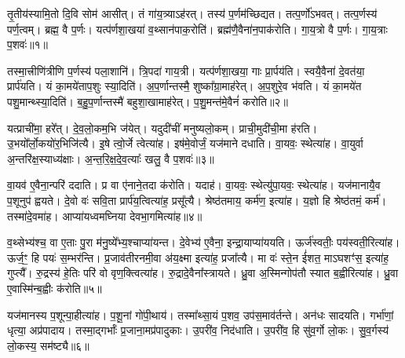\clearpage
{}
\setcounter{anuvakam}{0}

तृ॒तीय॑स्यामि॒तो दि॒वि सोम॑ आसीत्।
तं गा॑य॒त्र्या\-ऽह॑रत्।
तस्य॑ प॒र्णम॑च्छिद्यत।
तत्प॒र्णो॑\-ऽभवत्।
तत्प॒र्णस्य॑ पर्ण॒त्वम्।
ब्रह्म॒ वै प॒र्णः।
यत्प॑र्णशा॒खया॑ व॒थ्सान॑पाक॒रोति॑।
ब्रह्म॑णै॒वैना॑न॒पाक॑रोति।
गा॒य॒त्रो वै प॒र्णः।
गा॒य॒त्राः प॒शवः॑॥१॥\ip

तस्मा॒त्त्रीणि॑त्रीणि प॒र्णस्य॑ पला॒शानि॑।
त्रि॒पदा॑ गाय॒त्री।
यत्प॑र्णशा॒खया॒ गाः प्रा॒र्पय॑ति।
स्वयै॒वैना॑ दे॒वत॑या॒ प्रार्प॑यति।
यं का॒मये॑ताप॒शुः स्या॒दिति॑।
अ॒प॒र्णान्तस्मै॒ शुष्का᳚ग्रा॒माह॑रेत्।
अ॒प॒शुरे॒व भ॑वति।
यं का॒मये॑त पशु॒मान्थ्स्या॒दिति॑।
ब॒हु॒प॒र्णान्तस्मै॑ बहुशा॒खामाह॑रेत्।
प॒शु॒मन्त॑मे॒वैनं॑ करोति॥२॥\ip

यत्प्राची॑मा॒ हरे᳚त्।
दे॒व॒लो॒कम॒भि ज॑येत्।
यदुदी॑चीं मनुष्यलो॒कम्।
प्राची॒मुदी॑ची॒मा ह॑रति।
उ॒भयो᳚र्लो॒कयो॑र॒भि\-जि॑त्यै।
इ॒षे त्वो॒र्जे त्वेत्या॑ह।
इष॑मे॒वोर्जं॒ यज॑माने दधाति।
वा॒यवः॒ स्थेत्या॑ह।
वा॒युर्वा अ॒न्तरि॑क्ष॒स्याध्य॑क्षाः।
अ॒न्त॒रि॒क्ष॒दे॒व॒त्याः᳚ खलु॒ वै प॒शवः॑॥३॥\ip

वा॒यव॑ ए॒वैना॒न्परि॑ ददाति।
प्र वा ए॑नाने॒तदा क॑रोति।
यदाह॑।
वा॒यवः॒ स्थेत्यु॑पा॒यवः॒ स्थेत्या॑ह।
यज॑मानायै॒व प॒शूनुप॑ ह्वयते।
दे॒वो वः॑ सवि॒ता प्रार्प॑य॒त्वित्या॑ह॒ प्रसू᳚त्यै।
श्रेष्ठ॑तमाय॒ कर्म॑ण॒ इत्या॑ह।
य॒ज्ञो हि श्रेष्ठ॑तमं॒ कर्म॑।
तस्मा॑दे॒वमा॑ह।
आप्या॑यध्वमघ्निया देवभा॒गमित्या॑ह॥४॥\ip

व॒थ्सेभ्य॑श्च॒ वा ए॒ताः पु॒रा म॑नु॒ष्ये᳚भ्य॒श्चाप्या॑यन्त।
दे॒वेभ्य॑ ए॒वैना॒ इन्द्रा॒याप्या॑ययति।
ऊर्ज॑स्वतीः॒ पय॑स्वती॒रित्या॑ह।
ऊर्ज॒ꣳ॒ हि पयः॑ स॒म्भर॑न्ति।
प्र॒जाव॑तीरनमी॒वा अ॑य॒क्ष्मा इत्या॑ह॒ प्रजा᳚त्यै।
मा वः॑ स्ते॒न ई॑शत॒ माऽघशꣳ॑स॒ इत्या॑ह॒ गुप्त्यै᳚।
रु॒द्रस्य॑ हे॒तिः परि॑ वो वृण॒क्त्वित्या॑ह।
रु॒द्रादे॒वैना᳚स्त्रायते।
ध्रु॒वा अ॒स्मिन्गोप॑तौ स्यात ब॒ह्वीरित्या॑ह।
ध्रु॒वा ए॒वास्मि॑न्ब॒ह्वीः क॑रोति॥५॥\ip

यज॑मानस्य प॒शून्पा॒हीत्या॑ह।
प॒शू॒नां गो॑पी॒थाय॑।
तस्मा᳚थ्सा॒यं प॒शव॒ उप॑स॒माव॑र्तन्ते।
अन॑धः सादयति।
गर्भा॑णां॒ धृत्या॒ अप्र॑पादाय।
तस्मा॒द्गर्भाः᳚ प्र॒जाना॒मप्र॑पादुकाः।
उ॒परी॑व॒ निद॑धाति।
उ॒परी॑व॒ हि सु॑व॒र्गो लो॒कः।
सु॒व॒र्गस्य॑ लो॒कस्य॒ सम॑ष्ट्यै॥६॥\ip\anuvakamend[प॒शवः॑ करोति प॒शवो॑ देवभा॒गमित्या॑ह करोति॒ नव॑ च]


